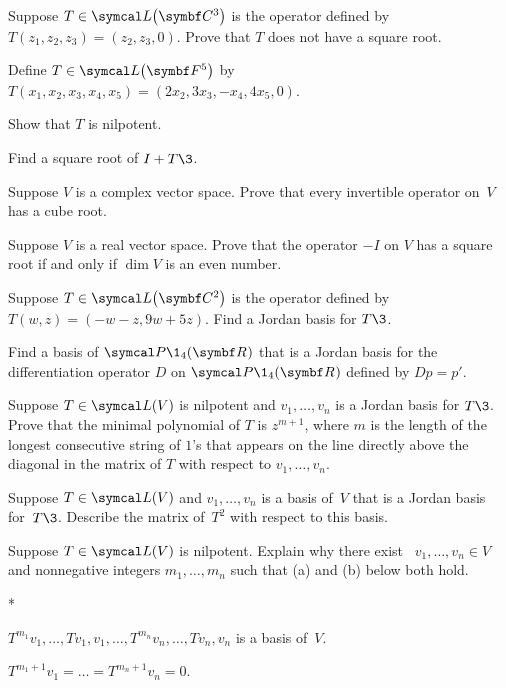 \begin{exercises}

\exercise
Suppose $T \in \L\paren[\big]{\C{3}}$ is the operator defined by $T(z_1, z_2, z_3) = (z_2, z_3, 0)$.  Prove
that $T$ does not have a square root.\label{195}


\exercise
Define $T \in \L\paren[\big]{\F{5}}$ by
$T(x_1, x_2, x_3, x_4, x_5) = (2 x_2, 3 x_3, -x_4, 4 x_5, 0)$.
\begin{subtheorem}
\item
Show that $T$ is nilpotent.
\item
Find a square root of $I + T\3$.
\end{subtheorem}
\exercisesubtheoremend


\exercise
Suppose $V$ is a complex vector space. Prove that every invertible operator
on~$V$ has a cube root.


\exercise
Suppose $V$ is a real vector space. Prove that the operator $-I$ on $V$ has a square root if and only if $\dim V$ is an even number.


\exercise
Suppose $T \in \L\paren[\big]{\C2}$ is the operator defined by $T(w, z) = (-w - z, 9w + 5z)$. Find a Jordan basis for $T\3$.


\exercise
Find a basis of $\P\1_4(\R{})$ that is a Jordan basis for the differentiation operator $D$ on $\P\1_4(\R{})$ defined by $Dp = p'\!$.


\exercise
Suppose $T \in \L(V)$ is nilpotent and $v_1, \ldots, v_n$ is a Jordan basis for $T\3$.  Prove that the minimal polynomial of $T$ is
$z^{m+1}$, where $m$ is the length of the longest consecutive string of $1$'s that
appears on the line directly above the diagonal in the matrix of $T$ with respect to
$v_1, \ldots, v_n$. \label{nilmin}


\exercise
Suppose $T \in \L(V)$ and $v_1, \dots, v_n$ is a basis of~$V$ that is a Jordan
basis for~$T\3$. Describe the matrix of~$T^2$ with respect to this basis.


\exercise
Suppose $T \in \L(V)$ is nilpotent. Explain why there exist \ $v_1, \dots, v_n \in V$ and nonnegative integers $m_1, \dots, m_n$ such that (a) and (b) below both hold.
\begin{subtheorem}*
\item
$T^{m_1}v_1, \dots, Tv_1, v_1, \dots, T^{m_n}v_n, \dots, Tv_n, v_n$ is a basis of~$V$.
\item
$T^{m_1 + 1} v_1 = \dots = T^{m_n + 1} v_n = 0$.
\end{subtheorem}
\exercisesubtheoremend



\end{exercises}
